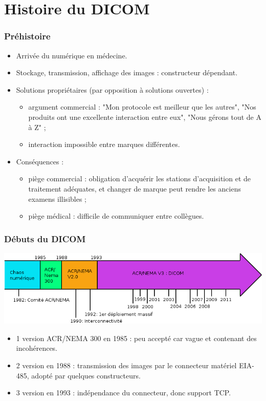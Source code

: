 \section{Histoire du DICOM}

	\frame
	{
		\frametitle{Pr\'ehistoire}
		
		\begin{itemize}
			\item Arriv\'ee du num\'erique en m\'edecine.
			\item Stockage, transmission, affichage des images : constructeur d\'ependant.
			\item Solutions propri\'etaires (par opposition \`a solutions ouvertes) :
			\begin{itemize}
				\item argument commercial : "Mon protocole est meilleur que les autres", "Nos produits ont une excellente interaction entre eux", "Nous g\'erons tout de A \`a Z" ;
				\item interaction impossible entre marques diff\'erentes.
			\end{itemize} 
			\item Cons\'equences :
			\begin{itemize}
				\item pi\`ege commercial : obligation d'acqu\'erir les stations d'acquisition et de traitement ad\'equates, et changer de marque peut rendre les anciens examens illisibles ;
				\item pi\`ege m\'edical : difficile de communiquer entre coll\`egues.
			\end{itemize}
		\end{itemize}
	}
					
	\frame
	{
		\frametitle{D\'ebuts du DICOM}
		\includegraphics[width=\linewidth]{./figures/chrono-dicom.png}

		\begin{itemize}
			\item 1 version ACR/NEMA 300 en 1985 : peu accept\'e car vague et contenant des incoh\'erences.
			\item 2 version en 1988 : transmission des images par le connecteur mat\'eriel EIA-485, adopt\'e par quelques constructeurs.
			\item 3 version en 1993 : ind\'ependance du connecteur, donc support TCP.
		\end{itemize}
	}
	
